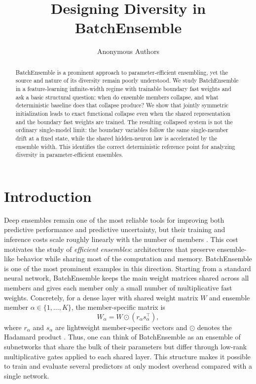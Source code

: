 \documentclass{article}
\title{Designing Diversity in BatchEnsemble}
\author{Anonymous Authors}
\begin{document}
\maketitle

\begin{abstract}
BatchEnsemble is a prominent approach to parameter-efficient ensembling, yet the source and nature of its diversity remain poorly understood. We study BatchEnsemble in a feature-learning infinite-width regime with trainable boundary fast weights and ask a basic structural question: when do ensemble members collapse, and what deterministic baseline does that collapse produce? We show that jointly symmetric initialization leads to exact functional collapse even when the shared representation and the boundary fast weights are trained. The resulting collapsed system is not the ordinary single-model limit: the boundary variables follow the same single-member drift at a fixed state, while the shared hidden-neuron law is accelerated by the ensemble width. This identifies the correct deterministic reference point for analyzing diversity in parameter-efficient ensembles.
\end{abstract}

\section{Introduction}

Deep ensembles remain one of the most reliable tools for improving both predictive performance and predictive uncertainty, but their training and inference costs scale roughly linearly with the number of members \cite{lakshminarayanan2017}. This cost motivates the study of \emph{efficient ensembles}: architectures that preserve ensemble-like behavior while sharing most of the computation and memory. BatchEnsemble is one of the most prominent examples in this direction. Starting from a standard neural network, BatchEnsemble keeps the main weight matrices shared across all members and gives each member only a small number of multiplicative fast weights. Concretely, for a dense layer with shared weight matrix $W$ and ensemble member $\alpha\in\{1,\dots,K\}$, the member-specific matrix is
\[
W_\alpha = W \odot (r_\alpha s_\alpha^\top),
\]
where $r_\alpha$ and $s_\alpha$ are lightweight member-specific vectors and $\odot$ denotes the Hadamard product \cite{wen2020}. Thus, one can think of BatchEnsemble as an ensemble of subnetworks that share the bulk of their parameters but differ through low-rank multiplicative gates applied to each shared layer. This structure makes it possible to train and evaluate several predictors at only modest overhead compared with a single network.
\end{document}
